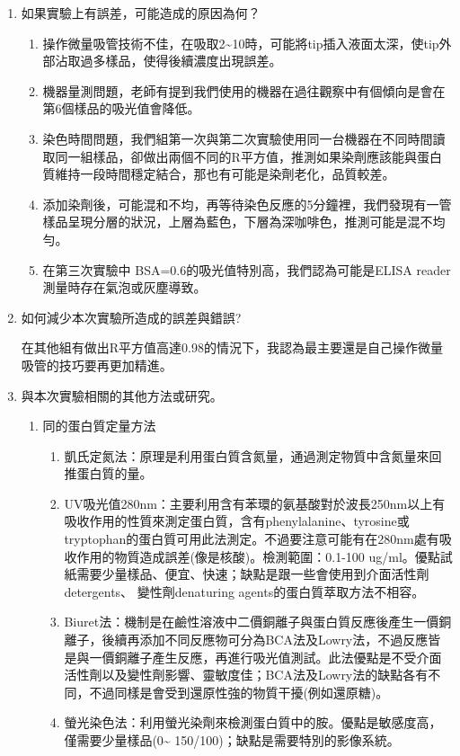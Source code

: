 \begin{enumerate}[label=\arabic*.]
  \item 如果實驗上有誤差，可能造成的原因為何？
  \begin{enumerate}[label=(\arabic*)]
    \item 操作微量吸管技術不佳，在吸取2\~{}10\mul 時，可能將tip插入液面太深，使tip外部沾取過多樣品，使得後續濃度出現誤差。
    \item 機器量測問題，老師有提到我們使用的機器在過往觀察中有個傾向是會在第6個樣品的吸光值會降低。
    \item 染色時間問題，我們組第一次與第二次實驗使用同一台機器在不同時間讀取同一組樣品，卻做出兩個不同的R平方值，推測如果染劑應該能與蛋白質維持一段時間穩定結合，那也有可能是染劑老化，品質較差。
    \item 添加染劑後，可能混和不均，再等待染色反應的5分鐘裡，我們發現有一管樣品呈現分層的狀況，上層為藍色，下層為深咖啡色，推測可能是混不均勻。
    \item 在第三次實驗中 BSA=0.6\mug 的吸光值特別高，我們認為可能是ELISA reader 測量時存在氣泡或灰塵導致。
  \end{enumerate}

  \item 如何減少本次實驗所造成的誤差與錯誤?

  \qquad 在其他組有做出R平方值高達0.98的情況下，我認為最主要還是自己操作微量吸管的技巧要再更加精進。
  \item 與本次實驗相關的其他方法或研究。
  \begin{enumerate}[label=(\arabic*)]
    \item 同的蛋白質定量方法 
    \begin{enumerate}[label=\alph*.]
      \item 凱氏定氮法：原理是利用蛋白質含氮量，通過測定物質中含氮量來回推蛋白質的量。
      \item UV吸光值280nm：主要利用含有苯環的氨基酸對於波長250nm以上有吸收作用的性質來測定蛋白質，含有phenylalanine、tyrosine或tryptophan的蛋白質可用此法測定。不過要注意可能有在280nm處有吸收作用的物質造成誤差(像是核酸)。檢測範圍：0.1-100 ug/ml。優點試紙需要少量樣品、便宜、快速；缺點是跟一些會使用到介面活性劑detergents、 變性劑denaturing agents的蛋白質萃取方法不相容。
      \item Biuret法：機制是在鹼性溶液中二價銅離子與蛋白質反應後產生一價銅離子，後續再添加不同反應物可分為BCA法及Lowry法，不過反應皆是與一價銅離子產生反應，再進行吸光值測試。此法優點是不受介面活性劑以及變性劑影響、靈敏度佳；BCA法及Lowry法的缺點各有不同，不過同樣是會受到還原性強的物質干擾(例如還原糖)。
      \item 螢光染色法：利用螢光染劑來檢測蛋白質中的胺。優點是敏感度高，僅需要少量樣品(0\~{} 150\mug/100\mul)；缺點是需要特別的影像系統。
    \end{enumerate}
  \end{enumerate}
  
  
  
  
  
\end{enumerate}



 

